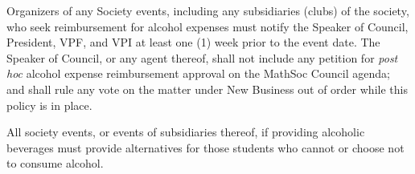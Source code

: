Organizers of any Society events, including any subsidiaries (clubs) of the society,  who seek reimbursement for alcohol expenses must notify the Speaker of Council, President, VPF, and VPI at least one (1) week prior to the event date. The Speaker of Council, or any agent thereof, shall not include any petition for \textit{post hoc} alcohol expense reimbursement approval on the MathSoc Council agenda; and shall rule any vote on the matter under New Business out of order while this policy is in place. 

All society events, or events of subsidiaries thereof, if providing alcoholic beverages must provide alternatives for those students who cannot or choose not to consume alcohol.
